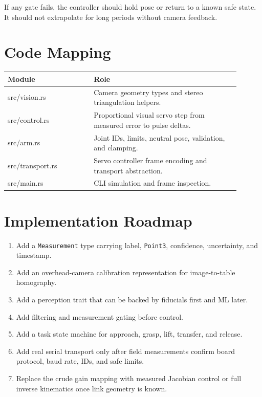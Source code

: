 \documentclass[11pt]{article}
\begin{document}
If any gate fails, the controller should hold pose or return to a known safe
state. It should not extrapolate for long periods without camera feedback.

\section{Code Mapping}

\begin{tabular}{>{\ttfamily}p{0.33\linewidth}p{0.57\linewidth}}
\textnormal{Module} & Role \\
\hline
src/vision.rs & Camera geometry types and stereo triangulation helpers. \\
src/control.rs & Proportional visual servo step from measured error to pulse deltas. \\
src/arm.rs & Joint IDs, limits, neutral pose, validation, and clamping. \\
src/transport.rs & Servo controller frame encoding and transport abstraction. \\
src/main.rs & CLI simulation and frame inspection. \\
\end{tabular}

\section{Implementation Roadmap}

\begin{enumerate}[leftmargin=*]
    \item Add a \texttt{Measurement} type carrying label, \texttt{Point3},
          confidence, uncertainty, and timestamp.
    \item Add an overhead-camera calibration representation for image-to-table
          homography.
    \item Add a perception trait that can be backed by fiducials first and ML
          later.
    \item Add filtering and measurement gating before control.
    \item Add a task state machine for approach, grasp, lift, transfer, and
          release.
    \item Add real serial transport only after field measurements confirm board
          protocol, baud rate, IDs, and safe limits.
    \item Replace the crude gain mapping with measured Jacobian control or full
          inverse kinematics once link geometry is known.
\end{enumerate}
\end{document}
